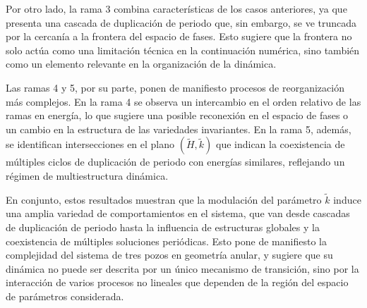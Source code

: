 Por otro lado, la rama 3 combina características de los casos anteriores, ya que presenta una cascada de duplicación de periodo que, sin embargo, se ve truncada por la cercanía a la frontera del espacio de fases. Esto sugiere que la frontera no solo actúa como una limitación técnica en la continuación numérica, sino también como un elemento relevante en la organización de la dinámica.

Las ramas 4 y 5, por su parte, ponen de manifiesto procesos de reorganización más complejos. En la rama 4 se observa un intercambio en el orden relativo de las ramas en energía, lo que sugiere una posible reconexión en el espacio de fases o un cambio en la estructura de las variedades invariantes. En la rama 5, además, se identifican intersecciones en el plano $(\tilde{H}, \tilde{k})$ que indican la coexistencia de múltiples ciclos de duplicación de periodo con energías similares, reflejando un régimen de multiestructura dinámica.

En conjunto, estos resultados muestran que la modulación del parámetro $\tilde{k}$ induce una amplia variedad de comportamientos en el sistema, que van desde cascadas de duplicación de periodo hasta la influencia de estructuras globales y la coexistencia de múltiples soluciones periódicas. Esto pone de manifiesto la complejidad del sistema de tres pozos en geometría anular, y sugiere que su dinámica no puede ser descrita por un único mecanismo de transición, sino por la interacción de varios procesos no lineales que dependen de la región del espacio de parámetros considerada.